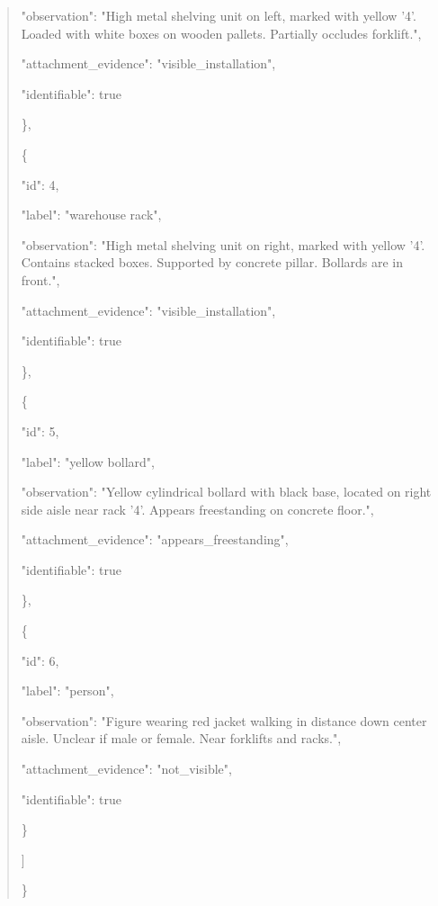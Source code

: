 \documentclass[10pt,a4paper]{article}
\begin{document}
\begin{quote}
      "observation":\allowbreak{} "High metal shelving unit on left,\allowbreak{} marked with yellow '4'. Loaded with white boxes on wooden pallets. Partially occludes forklift.",\allowbreak{}\par
      "attachment\_evidence":\allowbreak{} "visible\_installation",\allowbreak{}\par
      "identifiable":\allowbreak{} true\par
    \},\allowbreak{}\par
    \{\par
      "id":\allowbreak{} 4,\allowbreak{}\par
      "label":\allowbreak{} "warehouse rack",\allowbreak{}\par
      "observation":\allowbreak{} "High metal shelving unit on right,\allowbreak{} marked with yellow '4'. Contains stacked boxes. Supported by concrete pillar. Bollards are in front.",\allowbreak{}\par
      "attachment\_evidence":\allowbreak{} "visible\_installation",\allowbreak{}\par
      "identifiable":\allowbreak{} true\par
    \},\allowbreak{}\par
    \{\par
      "id":\allowbreak{} 5,\allowbreak{}\par
      "label":\allowbreak{} "yellow bollard",\allowbreak{}\par
      "observation":\allowbreak{} "Yellow cylindrical bollard with black base,\allowbreak{} located on right side aisle near rack '4'. Appears freestanding on concrete floor.",\allowbreak{}\par
      "attachment\_evidence":\allowbreak{} "appears\_freestanding",\allowbreak{}\par
      "identifiable":\allowbreak{} true\par
    \},\allowbreak{}\par
    \{\par
      "id":\allowbreak{} 6,\allowbreak{}\par
      "label":\allowbreak{} "person",\allowbreak{}\par
      "observation":\allowbreak{} "Figure wearing red jacket walking in distance down center aisle. Unclear if male or female. Near forklifts and racks.",\allowbreak{}\par
      "attachment\_evidence":\allowbreak{} "not\_visible",\allowbreak{}\par
      "identifiable":\allowbreak{} true\par
    \}\par
  ]\par
\}
\end{quote}
\end{document}
